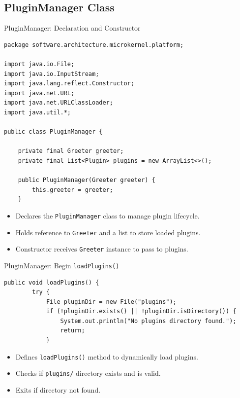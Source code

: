 \documentclass[aspectratio=169, table]{beamer}
\begin{document}
\subsection{PluginManager Class}

\begin{frame}[fragile]{PluginManager: Declaration and Constructor}
\vspace{20pt}
\begin{lstlisting}[style=JavaStyle, inputencoding=utf8, basicstyle=\tiny\ttfamily]
package software.architecture.microkernel.platform;

import java.io.File;
import java.io.InputStream;
import java.lang.reflect.Constructor;
import java.net.URL;
import java.net.URLClassLoader;
import java.util.*;

public class PluginManager {
	
	private final Greeter greeter;
	private final List<Plugin> plugins = new ArrayList<>();
	
	public PluginManager(Greeter greeter) {
		this.greeter = greeter;
	}
\end{lstlisting}

\begin{itemize}
	\item Declares the \texttt{PluginManager} class to manage plugin lifecycle.
	\item Holds reference to \texttt{Greeter} and a list to store loaded plugins.
	\item Constructor receives \texttt{Greeter} instance to pass to plugins.
\end{itemize}
\end{frame}

\begin{frame}[fragile]{PluginManager: Begin \texttt{loadPlugins()}}
\vspace{20pt}
\begin{lstlisting}[style=JavaStyle, inputencoding=utf8, basicstyle=\scriptsize\ttfamily]
	public void loadPlugins() {
		try {
			File pluginDir = new File("plugins");
			if (!pluginDir.exists() || !pluginDir.isDirectory()) {
				System.out.println("No plugins directory found.");
				return;
			}
		\end{lstlisting}
		
		\begin{itemize}
			\item Defines \texttt{loadPlugins()} method to dynamically load plugins.
			\item Checks if \texttt{plugins/} directory exists and is valid.
			\item Exits if directory not found.
		\end{itemize}
	\end{frame}
	
\end{document}
